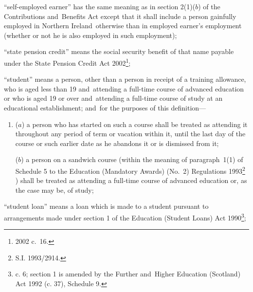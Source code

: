 \documentclass[12pt,a4paper]{article}
\begin{document}
\begin{enumerate}
“self-employed earner” has the same meaning as in section 2(1)($b$) of the Contributions and~Benefits Act
except that it shall include a person gainfully employed in Northern Ireland~otherwise than in employed earner’s employment (whether or not he is also employed in such employment);  %

“state pension credit” means the social security benefit of that name payable under the State Pension Credit Act 2002\footnote{2002 c.\ 16.};

“student” means a person, other than a person in receipt of a training allowance, who is aged less than 19 and~attending a full-time course of advanced education or who is aged 19 or over and~attending a full-time course of study at an educational establishment; and~for the purposes of this definition—
\begin{enumerate}\item[]
($a$)
a person who has started on such a course shall be treated as attending it throughout any period of term or vacation within it, until the last day of the course or such earlier date as he abandons it or is dismissed from it;

($b$)
a person on a sandwich course (within the meaning of paragraph~1(1) of Schedule 5 to the 
Education (Mandatory Awards) (No.\ 2) Regulations 1993\footnote{\frenchspacing S.I. 1993/2914.}%
) shall be treated as attending a full-time course of advanced education or, as the case may be, of study;
\end{enumerate}

“student loan” means a loan which is made to a student pursuant to arrangements made under section 1 of the Education (Student Loans) Act 1990\footnote{ c. 6; section 1 is amended by the Further and~Higher Education (Scotland) Act 1992 (c. 37), Schedule 9.};



\end{enumerate}
\end{document}
